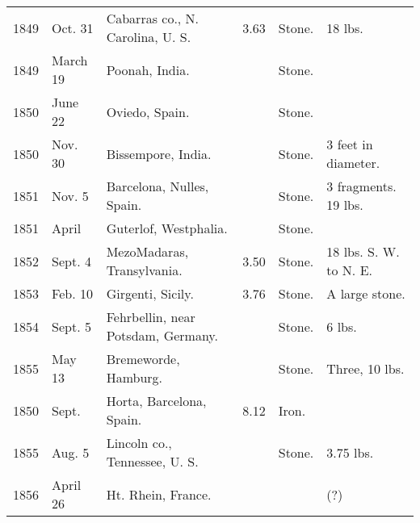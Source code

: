 \documentclass[a4paper, 12pt, oneside]{article}
\begin{document}
\begin{center}
\begin{longtable}{|p{10mm}|p{15mm}|p{32mm}|p{13mm}|p{13mm}|p{26mm}|}
        1849 & Oct. 31 & Cabarras co., N. Carolina, U. S. & 3.63 & Stone. & 18 lbs. \\
        1849 & March 19 & Poonah, India. & ~ & Stone. & ~ \\
        1850 & June 22 & Oviedo, Spain. & ~ & Stone. & ~ \\
        1850 & Nov. 30 & Bissempore, India. & ~ & Stone. & 3 feet in diameter. \\
        1851 & Nov. 5 & Barcelona, Nulles, Spain. & ~ & Stone. & 3 fragments. 19 lbs. \\
        1851 & April & Guterlof, Westphalia. & ~ & Stone. & ~ \\
        1852 & Sept. 4 & Mezo\-Madaras, Transylvania. & 3.50 & Stone. & 18 lbs. S. W. to N. E. \\
        1853 & Feb. 10 & Girgenti, Sicily. & 3.76 & Stone. & A large stone. \\
        1854 & Sept. 5 & Fehrbellin, near Potsdam, Germany. & ~ & Stone. & 6 lbs. \\
        1855 & May 13 & Bremeworde, Hamburg. & ~ & Stone. & Three, 10 lbs. \\
        1850 & Sept. & Horta, Barcelona, Spain. & 8.12 & Iron. & ~ \\
        1855 & Aug. 5 & Lincoln co., Tennessee, U. S. & ~ & Stone. & 3.75 lbs. \\
        1856 & April 26 & Ht. Rhein, France. & ~ & ~ & (?) \\ \hline
    \end{longtable}
\end{center}
\clearpage
\end{document}
